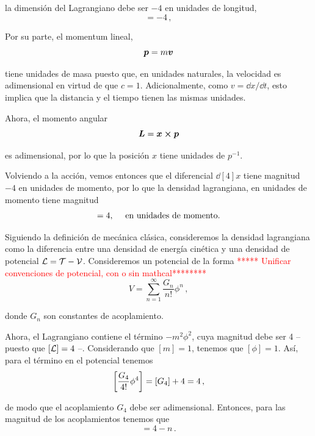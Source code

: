 \noindent la dimensión del Lagrangiano debe ser $-4$ en unidades de longitud,
%
\begin{equation*}
	[\lagdn] = -4 \,,
\end{equation*}

Por su parte, el momentum lineal,
%
\begin{equation*}
	\vb*{p} = m \vb*{v} 
\end{equation*}

\noindent tiene unidades de masa puesto que, en unidades naturales, la velocidad es adimensional en virtud de que $c = 1$. Adicionalmente, como $v = \dd x / \dd t$, esto implica que la distancia y el tiempo tienen las mismas unidades. 

Ahora, el momento angular
%
\begin{equation*}
	\vb*{L} = \vb*{x} \cross \vb*{p}
\end{equation*}

\noindent es adimensional, por lo que la posición $x$ tiene unidades de $p^{-1}$.

Volviendo a la acción, vemos entonces que el diferencial $\dd[4]x$ tiene magnitud $-4$ en unidades de momento, por lo que la densidad lagrangiana, en unidades de momento tiene magnitud
%
\begin{equation}
	[\lagdn] = 4 \qc \text{ en unidades de momento.}
\end{equation}

Siguiendo la definición de mecánica clásica, consideremos la densidad lagrangiana como la diferencia entre una densidad de energía cinética y una densidad de potencial $\mathcal{L} = \mathcal{T} - \mathcal{V}$. Consideremos un potencial de la forma \textcolor{red}{***** Unificar convenciones de potencial, con o sin mathcal********}
%
\begin{equation}
	V = \sum_{n = 1}^{\infty} \frac{G_n}{n!} \phi^n \,,
\end{equation}

\noindent donde $G_n$ son constantes de acoplamiento.

Ahora, el Lagrangiano contiene el término $-m^2 \phi^2$, cuya magnitud debe ser 4 -- puesto que $[\mathcal{L}] = 4$ --. Considerando que $[m] = 1$, tenemos que $[\phi] = 1$. Así, para el término en el potencial tenemos
%
\begin{equation}
	\qty[\frac{G_4}{4!} \phi^4] = [G_4] + 4 = 4\,,
\end{equation}

\noindent de modo que el acoplamiento $G_4$ debe ser adimensional. Entonces, para las magnitud de los acoplamientos tenemos que
%
\begin{equation}
	[G_n] = 4 - n \,.
\end{equation}

